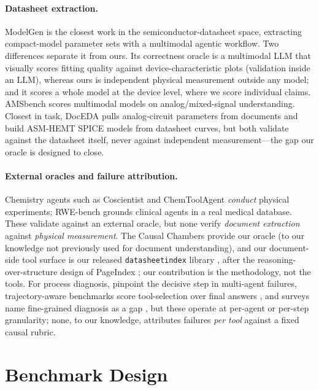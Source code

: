 \documentclass[11pt]{article}
\begin{document}
\paragraph{Datasheet extraction.}
ModelGen \citep{wei2025modelgen} is the closest work in the
semiconductor-datasheet space, extracting compact-model parameter sets
with a multimodal agentic workflow. Two differences separate it from
ours. Its correctness oracle is a multimodal LLM that visually scores
fitting quality against device-characteristic plots (validation inside
an LLM), whereas ours is independent physical measurement outside any
model; and it scores a whole model at the device level, where we score
individual claims. AMSbench \citep{shi2025amsbench} scores multimodal
models on analog/mixed-signal understanding. Closest in task, DocEDA
\citep{chen2024doceda} pulls analog-circuit parameters from documents and
\citet{peng2025hemt} build ASM-HEMT SPICE models from datasheet
curves, but both validate against the datasheet itself, never against
independent measurement---the gap our oracle is designed to close.

\paragraph{External oracles and failure attribution.}
Chemistry agents such as Coscientist \citep{boiko2023coscientist} and
ChemToolAgent \citep{yu2025chemtoolagent} \emph{conduct} physical
experiments;
RWE-bench \citep{li2026rwebench} grounds clinical agents in a real
medical database. These validate against an external oracle, but none
verify \emph{document extraction} against \emph{physical measurement}.
The Causal Chambers \citep{gamella2025chambers} provide our
oracle (to our knowledge not previously used for document
understanding), and our document-side tool surface is our
released \texttt{datasheetindex} library \citep{datasheetindex}, after
the reasoning-over-structure design of PageIndex \citep{pageindex2025};
our contribution is the methodology, not the tools.
For process diagnosis, \citet{zhang2025whowhen}
pinpoint the decisive step in multi-agent failures, trajectory-aware
benchmarks score tool-selection over final answers
\citep{he2025trajectbench}, and surveys name fine-grained diagnosis as a
gap \citep{yehudai2025survey}, but these operate at per-agent or per-step
granularity; none, to our knowledge, attributes failures \emph{per tool}
against a fixed causal rubric.

\section{Benchmark Design}
\label{sec:design}
\end{document}
